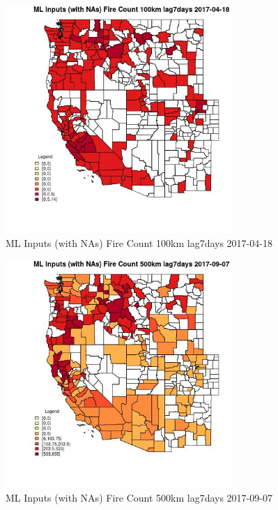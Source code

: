\begin{figure} 
\centering  
\includegraphics[width=0.77\textwidth]{Code_Outputs/Report_ML_input_PM25_Step4_part_e_de_duplicated_aves_compiled_2019-05-21wNAs_CountyFire_Count_100km_lag7daysMean2017-04-18.jpg} 
\caption{\label{fig:Report_ML_input_PM25_Step4_part_e_de_duplicated_aves_compiled_2019-05-21wNAsCountyFire_Count_100km_lag7daysMean2017-04-18}ML Inputs (with NAs) Fire Count 100km lag7days 2017-04-18} 
\end{figure} 
 

\begin{figure} 
\centering  
\includegraphics[width=0.77\textwidth]{Code_Outputs/Report_ML_input_PM25_Step4_part_e_de_duplicated_aves_compiled_2019-05-21wNAs_CountyFire_Count_500km_lag7daysMean2017-09-07.jpg} 
\caption{\label{fig:Report_ML_input_PM25_Step4_part_e_de_duplicated_aves_compiled_2019-05-21wNAsCountyFire_Count_500km_lag7daysMean2017-09-07}ML Inputs (with NAs) Fire Count 500km lag7days 2017-09-07} 
\end{figure} 
 

